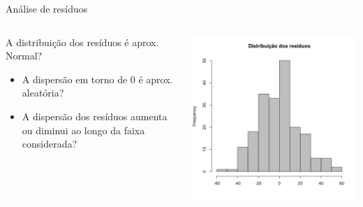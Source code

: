 \documentclass{beamer}
\begin{document}
\begin{frame}{Análise de resíduos}
  \begin{columns}
    \begin{column}{5cm}
      A distribuição dos resíduos é aprox. Normal?
      \bigskip
      \begin{itemize}
        \footnotesize
      \item A dispersão em torno de 0 é aprox. aleatória?
        \bigskip
      \item A dispersão dos resíduos aumenta ou diminui ao longo da faixa considerada?
      \end{itemize}
    \end{column}
    \begin{column}{5cm}
      \begin{center}
        \includegraphics[width=1.1\textwidth]{Cap18-19/pratica-hist-resid}
      \end{center}
    \end{column}
  \end{columns}
\end{frame}
\end{document}
